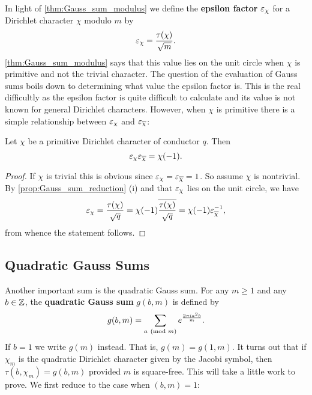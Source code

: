       In light of \cref{thm:Gauss_sum_modulus} we define the \textbf{epsilon factor} $\varepsilon_{\chi}$ for a Dirichlet character $\chi$ modulo $m$ by
      \[
        \varepsilon_{\chi} = \frac{\tau(\chi)}{\sqrt{m}}.
      \]
      \cref{thm:Gauss_sum_modulus} says that this value lies on the unit circle when $\chi$ is primitive and not the trivial character. The question of the evaluation of Gauss sums boils down to determining what value the epsilon factor is. This is the real difficultly as the epsilon factor is quite difficult to calculate and its value is not known for general Dirichlet characters. However, when $\chi$ is primitive there is a simple relationship between $\varepsilon_{\chi}$ and $\varepsilon_{\overline{\chi}}$:

      \begin{proposition}\label{prop:epsilon_factor_relationship}
        Let $\chi$ be a primitive Dirichlet character of conductor $q$. Then
        \[
          \varepsilon_{\chi}\varepsilon_{\overline{\chi}} = \chi(-1).
        \]
      \end{proposition}
      \begin{proof}
        If $\chi$ is trivial this is obvious since $\varepsilon_{\chi} = \varepsilon_{\overline{\chi}} = 1$. So assume $\chi$ is nontrivial. By \cref{prop:Gauss_sum_reduction} (i) and that $\varepsilon_{\chi}$ lies on the unit circle, we have
        \[
          \varepsilon_{\chi} = \frac{\tau(\chi)}{\sqrt{q}} = \chi(-1)\overline{\frac{\tau(\chi)}{\sqrt{q}}} = \chi(-1)\varepsilon_{\overline{\chi}}^{-1},
        \]
        from whence the statement follows.
      \end{proof}
    \subsection*{Quadratic Gauss Sums}
      Another important sum is the quadratic Gauss sum. For any $m \ge 1$ and any $b \in \mathbb{Z}$, the \textbf{quadratic Gauss sum} $g(b,m)$ is defined by
      \[
        g(b,m) = \sum_{a \ \left(\text{mod }m\right)}e^{\frac{2\pi ia^{2}b}{m}}.
      \]
      If $b = 1$ we write $g(m)$ instead. That is, $g(m) = g(1,m)$. It turns out that if $\chi_{m}$ is the quadratic Dirichlet character given by the Jacobi symbol, then $\tau(b,\chi_{m}) = g(b,m)$ provided $m$ is square-free. This will take a little work to prove. We first reduce to the case when $(b,m) = 1$:

